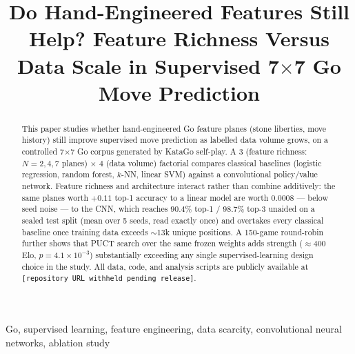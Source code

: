 \documentclass[conference,a4paper]{IEEEtran}
\newif\ifanon
\begin{document}
\title{Do Hand-Engineered Features Still Help? Feature Richness Versus Data
Scale in Supervised 7$\times$7 Go Move Prediction}

\ifanon
\author{\IEEEauthorblockN{Anonymous Authors}
\IEEEauthorblockA{Submission under double-blind review}}
\else
\author{
}
\fi

\maketitle

\begin{abstract}
This paper studies whether hand-engineered Go feature planes (stone
liberties, move history) still improve supervised move prediction as
labelled data volume grows, on a controlled 7$\times$7 Go corpus generated
by KataGo self-play. A 3 (feature richness: $N=2,4,7$ planes) $\times$ 4
(data volume) factorial compares classical baselines (logistic regression,
random forest, $k$-NN, linear SVM) against a convolutional policy/value
network. Feature richness and architecture interact rather than combine
additively: the same planes worth $+0.11$ top-1 accuracy to a linear model
are worth $0.0008$ --- below seed noise --- to the CNN, which reaches
$90.4\%$ top-1 / $98.7\%$ top-3 unaided on a sealed test split (mean over 5
seeds, read exactly once) and overtakes every classical baseline once
training data exceeds $\sim$13k unique positions. A
150-game round-robin further shows that PUCT search over the same frozen
weights adds strength ($\approx$400 Elo, $p{=}4.1{\times}10^{-3}$)
substantially exceeding any single supervised-learning design choice in
the study. All data, code, and analysis scripts are
publicly available\ifanon{} (link withheld for review)\else{} at
\texttt{[repository URL withheld pending release]}\fi.
\end{abstract}

\begin{IEEEkeywords}
Go, supervised learning, feature engineering, data scarcity, convolutional
neural networks, ablation study
\end{IEEEkeywords}
\end{document}
